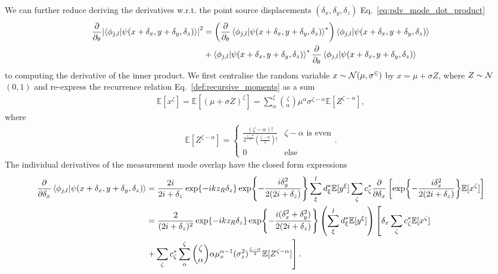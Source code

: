 \documentclass[reprint,amsmath,amssymb,aps,prl,floatfix,groupedaddress,superscriptaddress]{revtex4-2}
\begin{document}
We can further reduce deriving the derivatives w.r.t. the point source displacements $(\delta_x,\delta_y,\delta_z)$ Eq.~\eqref{eq:pdv_mode_dot_product}
\begin{align}
    \frac{\partial}{\partial_\theta} \abs{\braket{\phi_{j,l}}{\psi(x+\delta_x,y+\delta_y,\delta_z)}}^2 &= \left ( \frac{\partial}{\partial_\theta} \braket{\phi_{j,l}}{\psi(x+\delta_x,y+\delta_y,\delta_z)}^*\right ) \braket{\phi_{j,l}}{\psi(x+\delta_x,y+\delta_y,\delta_z)} \nonumber \\
    &+ \braket{\phi_{j,l}}{\psi(x+\delta_x,y+\delta_y,\delta_z)}^* \frac{\partial}{\partial_\theta} \braket{\phi_{j,l}}{\psi(x+\delta_x,y+\delta_y,\delta_z)}
\end{align}
to computing the derivative of the inner product. We first centralise the random variable $x \sim \cal{N} (\mu,\sigma^2)$ by $x=\mu + \sigma Z$, where $Z \sim \cal{N}$$(0,1)$ and re-express the recurrence relation Eq.~\eqref{def:recursive_moments} as a sum
\begin{align}
    \mathbb{E}[x^\zeta] = \mathbb{E}[(\mu + \sigma Z)^\zeta] = \sum_\alpha^\zeta \binom{\zeta}{\alpha} \mu^\alpha \sigma^{\zeta-\alpha} \mathbb{E}[Z^{\zeta-\alpha}],
\end{align}
where
\begin{align}
    \mathbb{E}[Z^{\zeta-\alpha}] = \begin{cases}
        \frac{(\zeta-\alpha)!}{2^{\frac{\zeta-\alpha}{2}} (\frac{\zeta-\alpha}{2})!} & \zeta-\alpha \text{ is even} \\
        0 & \text{else}
    \end{cases}.
\end{align}
The individual derivatives of the measurement mode overlap have the closed form expressions
\begin{align}
    \frac{\partial}{\partial \delta_x} \braket{\phi_{j,l}}{\psi(x+\delta_x,y+\delta_y,\delta_z)} &= \frac{2i}{2i + \delta_z}  \exp{-ikz_R\delta_z} \exp{-\frac{i \delta_y^2}{2(2i +\delta_z)}} \sum_\xi^l d^*_\xi \mathbb{E}[y^\xi]\sum_\zeta c^*_\zeta  \frac{\partial}{\partial \delta_x} \left [ \exp{-\frac{i\delta_x^2}{2(2i +\delta_z)}}\mathbb{E}[x^\zeta] \right ] \nonumber \\
    &=  \frac{2}{(2i + \delta_z)^2}  \exp{-ikz_R\delta_z} \exp{-\frac{i (\delta_x^2 + \delta_y^2)}{2(2i +\delta_z)}} \left ( \sum_\xi^l d^*_\xi \mathbb{E}[y^\xi] \right ) \left [ \delta_x \sum_\zeta c^*_\zeta \mathbb{E}[x^\zeta] \right. \nonumber \\
    & \left. + \sum_\zeta c^*_\zeta \sum^\zeta_\alpha \binom{\zeta}{\alpha} \alpha \mu_x^{\alpha-1} (\sigma_z^2)^{\frac{\zeta-\alpha}{2}}  \mathbb{E}[Z^{\zeta-\alpha}] \right ].

\end{align}$$
\end{document}
